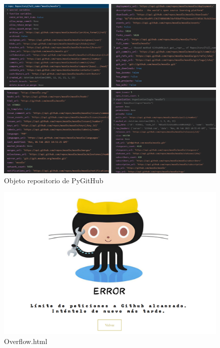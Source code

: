 \documentclass[a4paper, 12pt]{book}
\begin{document}
\begin{figure}
    \centering
    \includegraphics[width=1\textwidth, keepaspectratio]{img/objeto_repositorio.png}
    \caption{Objeto repositorio de PyGitHub}\label{fig:Objeto repositorio de PyGitHub}
\end{figure}
\begin{figure}
    \centering
    \includegraphics[bb=0 0 800 600, width=12cm, keepaspectratio]{img/overflow.png}
    \caption{Overflow.html}\label{fig:error overflow}
\end{figure}
\end{document}
